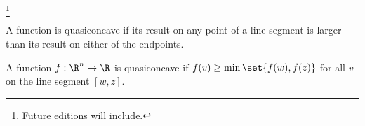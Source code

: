 
  \ifhmode\unskip\fi\footnote{
Future editions will include.
  }


A function is quasiconcave if its result on any point of a line segment is larger than its result on either of the endpoints.


A function $f: \R ^n \to \R $ is quasiconcave if $f(v) \geq \min\set{f(w), f(z)}$ for all $v$ on the line segment $[w, z]$.

\blankpage
